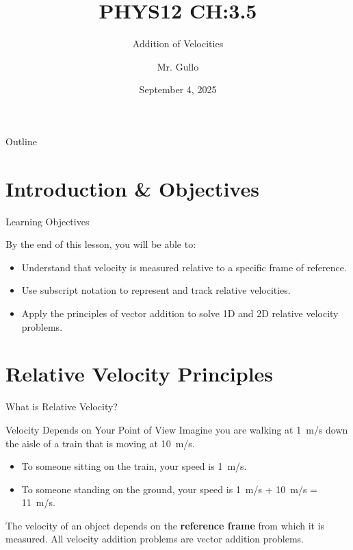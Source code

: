 \documentclass{beamer}
\title[Relative Velocity]{PHYS12 CH:3.5}
\subtitle{Addition of Velocities}
\author[Mr. Gullo]{Mr. Gullo}
\date[Sep 4, 2025]{September 4, 2025}
\begin{document}
\frame{\titlepage}

\begin{frame}{Outline}
    \tableofcontents
\end{frame}

\section{Introduction \& Objectives}

\begin{frame}{Learning Objectives}
    \begin{block}{By the end of this lesson, you will be able to:}
        \begin{itemize}
            \item Understand that velocity is measured relative to a specific frame of reference.
            \item Use subscript notation to represent and track relative velocities.
            \item Apply the principles of vector addition to solve 1D and 2D relative velocity problems.
        \end{itemize}
    \end{block}
\end{frame}

\section{Relative Velocity Principles}

\begin{frame}{What is Relative Velocity?}
    \begin{block}{Velocity Depends on Your Point of View}
        Imagine you are walking at \SI{1}{m/s} down the aisle of a train that is moving at \SI{10}{m/s}.
        \begin{itemize}
            \item To someone sitting on the train, your speed is \SI{1}{m/s}.
            \item To someone standing on the ground, your speed is \SI{1}{m/s} + \SI{10}{m/s} = \SI{11}{m/s}.
        \end{itemize}
        The velocity of an object depends on the \textbf{reference frame} from which it is measured. All velocity addition problems are vector addition problems.
    \end{block}
    
    \begin{center}
    
    \end{center}
\end{frame}
\end{document}
